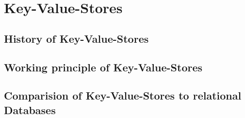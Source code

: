 
\section{Key-Value-Stores}
\todo{}
\subsection{History of Key-Value-Stores}
\subsection{Working principle of Key-Value-Stores}
\todo{}
\subsection{Comparision of Key-Value-Stores to relational Databases}
\todo{}
